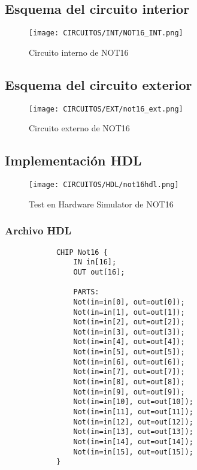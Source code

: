\documentclass[12pt]{article}
\begin{document}
		\subsection{Esquema del circuito interior}
		\begin{figure}[H]
			\centering
			\texttt{[image: CIRCUITOS/INT/NOT16\_INT.png]}
			\caption{Circuito interno de NOT16 \cite{circuitverse}}
			\label{fig:not16_int}
		\end{figure}
		\subsection{Esquema del circuito exterior}
		\begin{figure}[H]
			\centering
			\texttt{[image: CIRCUITOS/EXT/not16\_ext.png]}
			\caption{Circuito externo de NOT16 \cite{circuitverse}}
			\label{fig:not16_ext}
		\end{figure}
		\subsection{Implementación HDL}
		\begin{figure}[H]
			\centering
			\texttt{[image: CIRCUITOS/HDL/not16hdl.png]}
			\caption{Test en Hardware Simulator de NOT16 \cite{nand2tetris}}
			\label{fig:hdlnot16}
		\end{figure}

		\subsubsection{Archivo HDL}
		\begin{lstlisting}
			CHIP Not16 {
				IN in[16];
				OUT out[16];

				PARTS:
				Not(in=in[0], out=out[0]);
				Not(in=in[1], out=out[1]);
				Not(in=in[2], out=out[2]);
				Not(in=in[3], out=out[3]);
				Not(in=in[4], out=out[4]);
				Not(in=in[5], out=out[5]);
				Not(in=in[6], out=out[6]);
				Not(in=in[7], out=out[7]);
				Not(in=in[8], out=out[8]);
				Not(in=in[9], out=out[9]);
				Not(in=in[10], out=out[10]);
				Not(in=in[11], out=out[11]);
				Not(in=in[12], out=out[12]);
				Not(in=in[13], out=out[13]);
				Not(in=in[14], out=out[14]);
				Not(in=in[15], out=out[15]);
			}
		\end{lstlisting}
		\newpage

\end{document}
